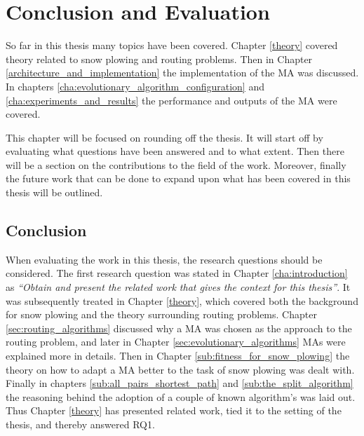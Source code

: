 \chapter{Conclusion and Evaluation}

So far in this thesis many topics have been covered. Chapter \ref{theory} covered theory related to snow plowing and routing problems. Then in Chapter \ref{architecture_and_implementation} the implementation of the MA was discussed. In chapters \ref{cha:evolutionary_algorithm_configuration} and \ref{cha:experiments_and_results} the performance and outputs of the MA were covered.

This chapter will be focused on rounding off the thesis. It will start off by evaluating what questions have been answered and to what extent. Then there will be a section on the contributions to the field of the work. Moreover, finally the future work that can be done to expand upon what has been covered in this thesis will be outlined.

\section{Conclusion}

When evaluating the work in this thesis, the research questions should be considered. The first research question was stated in Chapter \ref{cha:introduction} as \emph{\enquote{Obtain and present the related work that gives the context for this thesis}}. It was subsequently treated in Chapter \ref{theory}, which covered both the background for snow plowing and the theory surrounding routing problems. Chapter \ref{sec:routing_algorithms} discussed why a MA was chosen as the approach to the routing problem, and later in Chapter \ref{sec:evolutionary_algorithms} MAs were explained more in details. Then in Chapter \ref{sub:fitness_for_snow_plowing} the theory on how to adapt a MA better to the task of snow plowing was dealt with. Finally in chapters \ref{sub:all_pairs_shortest_path} and \ref{sub:the_split_algorithm} the reasoning behind the adoption of a couple of known algorithm's was laid out. Thus Chapter \ref{theory} has presented related work, tied it to the setting of the thesis, and thereby answered RQ1.

